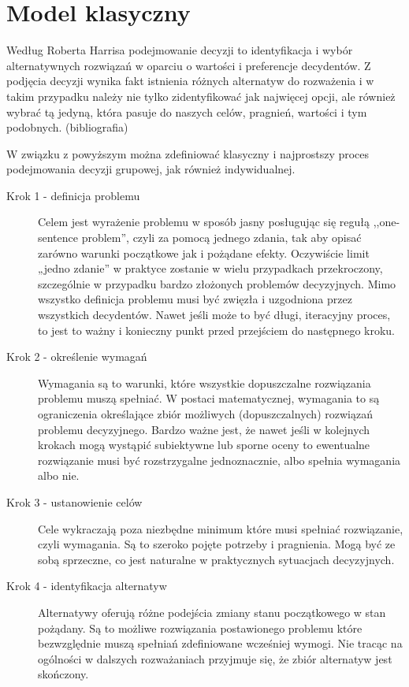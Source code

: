 \section{Model klasyczny}
Według Roberta Harrisa podejmowanie decyzji to identyfikacja i wybór alternatywnych 
rozwiązań w oparciu o wartości i preferencje decydentów. Z podjęcia decyzji 
wynika fakt istnienia różnych alternatyw do rozważenia i w takim przypadku 
należy nie tylko zidentyfikować jak najwięcej opcji, ale również wybrać tą jedyną, 
która pasuje do naszych celów, pragnień, wartości i tym podobnych. (bibliografia)

W związku z powyższym można zdefiniować klasyczny i najprostszy proces 
podejmowania decyzji grupowej, jak również indywidualnej.
\begin{description}
  \item[Krok 1 - definicja problemu] Celem jest wyrażenie problemu w
  sposób jasny posługując się regułą ,,one-sentence problem'', czyli za pomocą
  jednego zdania, tak aby opisać zarówno warunki początkowe jak i pożądane
  efekty. Oczywiście limit „jedno zdanie” w praktyce zostanie w wielu
  przypadkach przekroczony, szczególnie w przypadku bardzo złożonych problemów 
  decyzyjnych. Mimo wszystko definicja problemu musi być zwięzła i uzgodniona
  przez wszystkich decydentów. Nawet jeśli może to być długi, iteracyjny proces,
  to jest to ważny i konieczny punkt przed przejściem do następnego kroku.
  
  \item[Krok 2 - określenie wymagań] Wymagania są to warunki, które wszystkie
  dopuszczalne rozwiązania problemu muszą spełniać. W postaci matematycznej, 
  wymagania to są ograniczenia określające zbiór możliwych (dopuszczalnych) 
  rozwiązań problemu decyzyjnego. Bardzo ważne jest, że nawet jeśli w kolejnych 
  krokach mogą wystąpić subiektywne lub sporne oceny to ewentualne rozwiązanie 
  musi być rozstrzygalne jednoznacznie, albo spełnia wymagania albo nie.
  
  \item[Krok 3 - ustanowienie celów] Cele wykraczają poza niezbędne minimum
  które musi spełniać rozwiązanie, czyli wymagania. Są to szeroko pojęte 
  potrzeby i pragnienia. Mogą być ze sobą sprzeczne, co jest naturalne w 
  praktycznych sytuacjach decyzyjnych.
  
  \item[Krok 4 - identyfikacja alternatyw] Alternatywy oferują różne podejścia
  zmiany stanu początkowego w stan pożądany. Są to możliwe rozwiązania 
  postawionego problemu które bezwzględnie muszą spełniań zdefiniowane 
  wcześniej wymogi. Nie tracąc na ogólności w dalszych rozważaniach przyjmuje 
  się, że zbiór alternatyw jest skończony.
  

\end{description}
